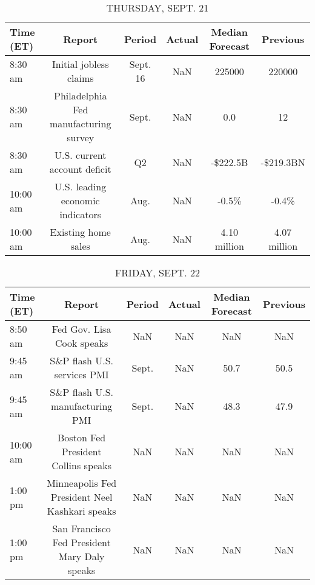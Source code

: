 \documentclass{article}%
\begin{document}
%


\begin{table}[htbp]%
\caption{THURSDAY, SEPT. 21}%
\centering%
\begin{adjustbox}{width=1\textwidth}%
\begin{tabular}{lccccc}
\toprule
Time (ET) &                                Report &   Period & Actual & Median Forecast &     Previous \\
\midrule
  8:30 am &                Initial jobless claims & Sept. 16 &    NaN &          225000 &       220000 \\
  8:30 am & Philadelphia Fed manufacturing survey &    Sept. &    NaN &             0.0 &           12 \\
  8:30 am &          U.S. current account deficit &       Q2 &    NaN &        -\$222.5B &    -\$219.3BN \\
 10:00 am &      U.S. leading economic indicators &     Aug. &    NaN &           -0.5\% &        -0.4\% \\
 10:00 am &                   Existing home sales &     Aug. &    NaN &    4.10 million & 4.07 million \\
\bottomrule
\end{tabular}
%
\end{adjustbox}%
\end{table}

%


\begin{table}[htbp]%
\caption{FRIDAY, SEPT. 22}%
\centering%
\begin{adjustbox}{width=1\textwidth}%
\begin{tabular}{lccccc}
\toprule
Time (ET) &                                         Report & Period & Actual & Median Forecast & Previous \\
\midrule
  8:50 am &                      Fed Gov. Lisa Cook speaks &    NaN &    NaN &             NaN &      NaN \\
  9:45 am &                    S\&P flash U.S. services PMI &  Sept. &    NaN &            50.7 &     50.5 \\
  9:45 am &               S\&P flash U.S. manufacturing PMI &  Sept. &    NaN &            48.3 &     47.9 \\
 10:00 am &            Boston Fed President Collins speaks &    NaN &    NaN &             NaN &      NaN \\
  1:00 pm & Minneapolis Fed President Neel Kashkari speaks &    NaN &    NaN &             NaN &      NaN \\
  1:00 pm &   San Francisco Fed President Mary Daly speaks &    NaN &    NaN &             NaN &      NaN \\
\bottomrule
\end{tabular}
%
\end{adjustbox}%
\end{table}
\end{document}
